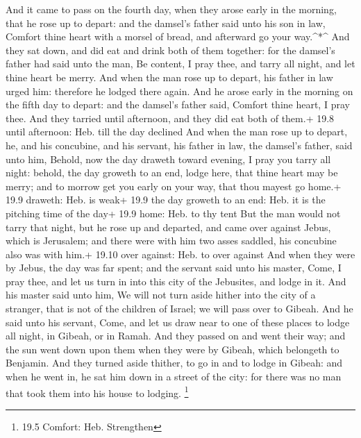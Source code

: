  And it came to pass on the fourth day, when they arose
early in the morning, that he rose up to depart: and the damsel's father
said unto his son in law, Comfort thine heart with a morsel of bread,
and afterward go your way.\^{}*\^{}  And they sat down, and
did eat and drink both of them together: for the damsel's father had
said unto the man, Be content, I pray thee, and tarry all night, and let
thine heart be merry.  And when the man rose up to depart,
his father in law urged him: therefore he lodged there again.
 And he arose early in the morning on the fifth day to
depart: and the damsel's father said, Comfort thine heart, I pray thee.
And they tarried until afternoon, and they did eat both of them.+ 19.8
until afternoon: Heb. till the day declined  And when the
man rose up to depart, he, and his concubine, and his servant, his
father in law, the damsel's father, said unto him, Behold, now the day
draweth toward evening, I pray you tarry all night: behold, the day
groweth to an end, lodge here, that thine heart may be merry; and to
morrow get you early on your way, that thou mayest go home.+ 19.9
draweth: Heb. is weak+ 19.9 the day groweth to an end: Heb. it is the
pitching time of the day+ 19.9 home: Heb. to thy tent  But
the man would not tarry that night, but he rose up and departed, and
came over against Jebus, which is Jerusalem; and there were with him two
asses saddled, his concubine also was with him.+ 19.10 over against:
Heb. to over against  And when they were by Jebus, the day
was far spent; and the servant said unto his master, Come, I pray thee,
and let us turn in into this city of the Jebusites, and lodge in it.
 And his master said unto him, We will not turn aside
hither into the city of a stranger, that is not of the children of
Israel; we will pass over to Gibeah.  And he said unto his
servant, Come, and let us draw near to one of these places to lodge all
night, in Gibeah, or in Ramah.  And they passed on and went
their way; and the sun went down upon them when they were by Gibeah,
which belongeth to Benjamin.  And they turned aside
thither, to go in and to lodge in Gibeah: and when he went in, he sat
him down in a street of the city: for there was no man that took them
into his house to lodging. \footnote{19.5 Comfort: Heb. Strengthen}

